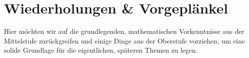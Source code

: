 \chapter{Wiederholungen \& Vorgeplänkel}
	Hier möchten wir auf die grundlegenden, mathematischen Vorkenntnisse aus der
	Mittelstufe zurückgreifen und einige Dinge aus der Oberstufe vorziehen, um eine
	solide Grundlage für die eigentlichen, späteren Themen zu legen.

	

	

	

	

	

	

	

	

	

	

